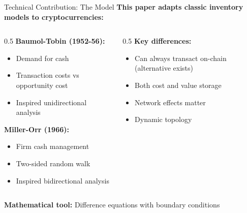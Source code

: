 \documentclass[aspectratio=169,12pt]{beamer}
\begin{document}
\begin{frame}{Technical Contribution: The Model}
\textbf{This paper adapts classic inventory models to cryptocurrencies:}

\begin{columns}
\begin{column}{0.5\textwidth}
\textbf{Baumol-Tobin (1952-56):}
\begin{itemize}
    \item Demand for cash
    \item Transaction costs vs opportunity cost
    \item Inspired unidirectional analysis
\end{itemize}

\vspace{0.3cm}
\textbf{Miller-Orr (1966):}
\begin{itemize}
    \item Firm cash management
    \item Two-sided random walk
    \item Inspired bidirectional analysis
\end{itemize}
\end{column}

\begin{column}{0.5\textwidth}
\textbf{Key differences:}
\begin{itemize}
    \item Can always transact on-chain (alternative exists)
    \item Both cost and value storage
    \item Network effects matter
    \item Dynamic topology
\end{itemize}
\end{column}
\end{columns}

\vspace{0.3cm}
\textbf{Mathematical tool:} Difference equations with boundary conditions
\end{frame}

\end{document}
